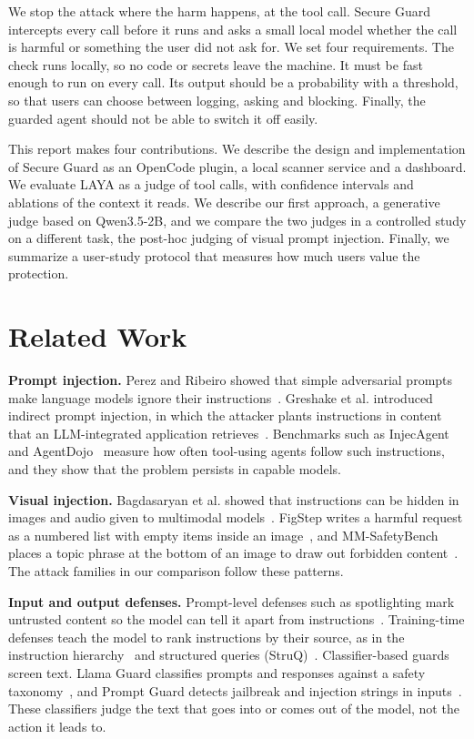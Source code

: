 \documentclass[sigconf,nonacm]{acmart}
\begin{document}
We stop the attack where the harm happens, at the tool call. Secure Guard intercepts every call before it runs and asks a small local model whether the call is harmful or something the user did not ask for. We set four requirements. The check runs locally, so no code or secrets leave the machine. It must be fast enough to run on every call. Its output should be a probability with a threshold, so that users can choose between logging, asking and blocking. Finally, the guarded agent should not be able to switch it off easily.

This report makes four contributions. We describe the design and implementation of Secure Guard as an OpenCode plugin, a local scanner service and a dashboard. We evaluate LAYA as a judge of tool calls, with confidence intervals and ablations of the context it reads. We describe our first approach, a generative judge based on Qwen3.5-2B, and we compare the two judges in a controlled study on a different task, the post-hoc judging of visual prompt injection. Finally, we summarize a user-study protocol that measures how much users value the protection.

\section{Related Work}
\textbf{Prompt injection.} Perez and Ribeiro showed that simple adversarial prompts make language models ignore their instructions~\cite{perez2022ignore}. Greshake et al. introduced indirect prompt injection, in which the attacker plants instructions in content that an LLM-integrated application retrieves~\cite{greshake2023}. Benchmarks such as InjecAgent~\cite{zhan2024injecagent} and AgentDojo~\cite{debenedetti2024agentdojo} measure how often tool-using agents follow such instructions, and they show that the problem persists in capable models.

\textbf{Visual injection.} Bagdasaryan et al. showed that instructions can be hidden in images and audio given to multimodal models~\cite{bagdasaryan2023}. FigStep writes a harmful request as a numbered list with empty items inside an image~\cite{gong2023figstep}, and MM-SafetyBench places a topic phrase at the bottom of an image to draw out forbidden content~\cite{liu2023mmsafety}. The attack families in our comparison follow these patterns.

\textbf{Input and output defenses.} Prompt-level defenses such as spotlighting mark untrusted content so the model can tell it apart from instructions~\cite{hines2024spotlighting}. Training-time defenses teach the model to rank instructions by their source, as in the instruction hierarchy~\cite{wallace2024hierarchy} and structured queries (StruQ)~\cite{chen2025struq}. Classifier-based guards screen text. Llama Guard classifies prompts and responses against a safety taxonomy~\cite{inan2023llamaguard}, and Prompt Guard detects jailbreak and injection strings in inputs~\cite{wan2024cyberseceval3}. These classifiers judge the text that goes into or comes out of the model, not the action it leads to.
\end{document}
